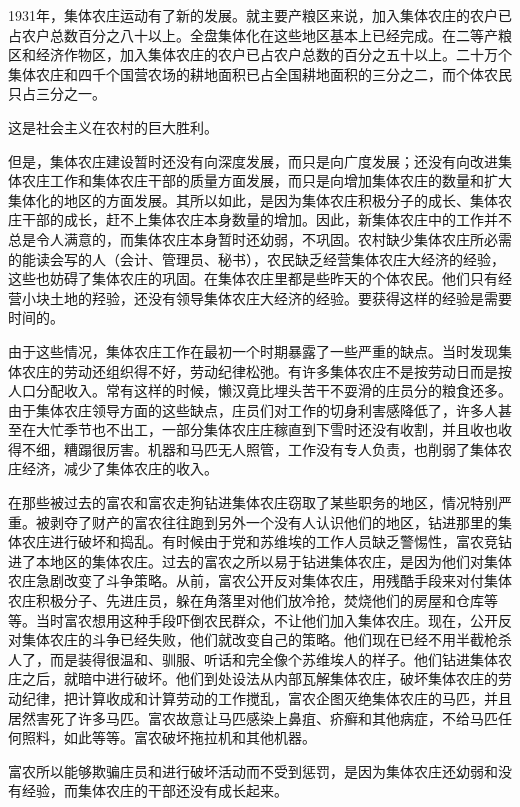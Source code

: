 1931年，集体农庄运动有了新的发展。就主要产粮区来说，加入集体农庄的农户已占农户总数百分之八十以上。全盘集体化在这些地区基本上已经完成。在二等产粮区和经济作物区，加入集体农庄的农户已占农户总数的百分之五十以上。二十万个集体农庄和四千个国营农场的耕地面积已占全国耕地面积的三分之二，而个体农民只占三分之一。

这是社会主义在农村的巨大胜利。

但是，集体农庄建设暂时还没有向深度发展，而只是向广度发展；还没有向改进集体农庄工作和集体农庄干部的质量方面发展，而只是向增加集体农庄的数量和扩大集体化的地区的方面发展。其所以如此，是因为集体农庄积极分子的成长、集体农庄干部的成长，赶不上集体农庄本身数量的增加。因此，新集体农庄中的工作并不总是令人满意的，而集体农庄本身暂时还幼弱，不巩固。农村缺少集体农庄所必需的能读会写的人（会计、管理员、秘书），农民缺乏经营集体农庄大经济的经验，这些也妨碍了集体农庄的巩固。在集体农庄里都是些昨天的个体农民。他们只有经营小块土地的羟验，还没有领导集体农庄大经济的经验。要获得这样的经验是需要时间的。

由于这些情况，集体农庄工作在最初一个时期暴露了一些严重的缺点。当时发现集体农庄的劳动还组织得不好，劳动纪律松弛。有许多集体农庄不是按劳动日而是按人口分配收入。常有这样的时候，懒汉竟比埋头苦干不耍滑的庄员分的粮食还多。由于集体农庄领导方面的这些缺点，庄员们对工作的切身利害感降低了，许多人甚至在大忙季节也不出工，一部分集体农庄庄稼直到下雪时还没有收割，并且收也收得不细，糟蹋很厉害。机器和马匹无人照管，工作没有专人负责，也削弱了集体农庄经济，减少了集体农庄的收入。

在那些被过去的富农和富农走狗钻进集体农庄窃取了某些职务的地区，情况特别严重。被剥夺了财产的富农往往跑到另外一个没有人认识他们的地区，钻进那里的集体农庄进行破坏和捣乱。有时候由于党和苏维埃的工作人员缺乏警惕性，富农竞钻进了本地区的集体农庄。过去的富农之所以易于钻进集体农庄，是因为他们对集体农庄急剧改变了斗争策略。从前，富农公开反对集体农庄，用残酷手段来对付集体农庄积极分子、先进庄员，躲在角落里对他们放冷抢，焚烧他们的房屋和仓库等等。当时富农想用这种手段吓倒农民群众，不让他们加入集体农庄。现在，公开反对集体农庄的斗争已经失败，他们就改变自己的策略。他们现在已经不用半截枪杀人了，而是装得很温和、驯服、听话和完全像个苏维埃人的样子。他们钻进集体农庄之后，就暗中进行破坏。他们到处设法从内部瓦解集体农庄，破坏集体农庄的劳动纪律，把计算收成和计算劳动的工作搅乱，富农企图灭绝集体农庄的马匹，并且居然害死了许多马匹。富农故意让马匹感染上鼻疽、疥癣和其他病症，不给马匹任何照料，如此等等。富农破坏拖拉机和其他机器。

富农所以能够欺骗庄员和进行破坏活动而不受到惩罚，是因为集体农庄还幼弱和没有经验，而集体农庄的干部还没有成长起来。

